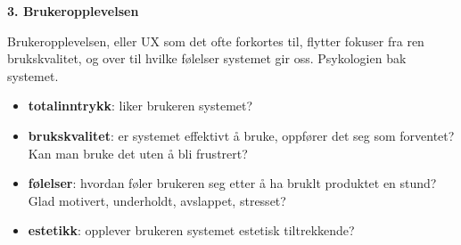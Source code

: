 \documentclass{article}
\begin{document}
\begin{flushleft}
\textbf{3. Brukeropplevelsen} \par
Brukeropplevelsen, eller UX som det ofte forkortes til, flytter fokuser fra ren brukskvalitet, og over til hvilke følelser systemet gir oss.
Psykologien bak systemet. 
\begin{itemize}
    \item \textbf{totalinntrykk}: liker brukeren systemet?
    \item \textbf{brukskvalitet}: er systemet effektivt å bruke, oppfører det seg som forventet? Kan man bruke det uten å bli frustrert?
    \item \textbf{følelser}: hvordan føler brukeren seg etter å ha bruklt produktet en stund? Glad motivert, underholdt, avslappet, stresset?
    \item \textbf{estetikk}: opplever brukeren systemet estetisk tiltrekkende? 
\end{itemize}

\end{flushleft}
\end{document}

